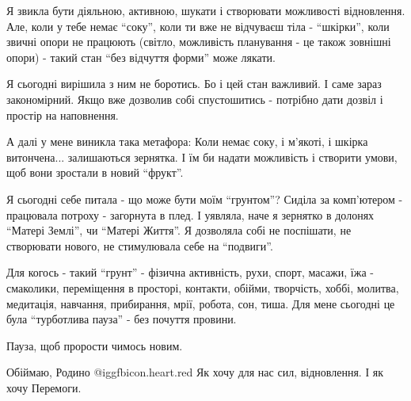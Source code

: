 Я звикла бути діяльною, активною, шукати і створювати можливості відновлення.
Але, коли у тебе немає \enquote{соку}, коли ти вже не відчуваєш тіла - \enquote{шкірки}, коли
звичні опори не працюють (світло, можливість планування - це також зовнішні
опори) - такий стан \enquote{без відчуття форми} може лякати.

Я сьогодні вирішила з ним не боротись. Бо і цей стан важливий. І саме зараз
закономірний. Якщо вже дозволив собі спустошитись - потрібно дати дозвіл і
простір на наповнення.

А далі у мене виникла така метафора: Коли немає соку, і м'якоті, і шкірка
витончена... залишаються зернятка. І їм би надати можливість і створити умови,
щоб вони зростали в новий \enquote{фрукт}.

Я сьогодні себе питала - що може бути моїм \enquote{грунтом}? Сиділа за комп'ютером -
працювала потроху - загорнута в плед. І уявляла, наче я зернятко в долонях
\enquote{Матері Землі}, чи \enquote{Матері Життя}. Я дозволяла собі не поспішати, не створювати
нового, не стимулювала себе на \enquote{подвиги}.

Для когось - такий \enquote{грунт} - фізична активність, рухи, спорт, масажи, їжа -
смаколики, переміщення в просторі, контакти, обійми, творчість, хоббі, молитва,
медитація, навчання, прибирання, мрії, робота, сон, тиша. Для мене сьогодні це
була \enquote{турботлива пауза} - без почуття провини.

Пауза, щоб прорости чимось новим.

Обіймаю, Родино @igg{fbicon.heart.red}  Як хочу для нас сил, відновлення. І як хочу Перемоги.


